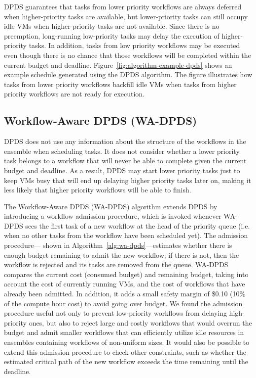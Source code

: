 \documentclass[preprint,5p]{elsarticle}
\begin{document}
DPDS guarantees that tasks from lower priority workflows are always deferred
when higher-priority tasks are available, but lower-priority tasks can still
occupy idle VMs when higher-priority tasks are not available. Since there is
no preemption, long-running low-priority tasks may delay the execution of
higher-priority tasks. In addition, tasks from low priority workflows may be
executed even though there is no chance that those workflows will be completed
within the current budget and deadline. Figure~\ref{fig:algorithm-example-dpds}
shows an example schedule generated using the DPDS algorithm. The figure
illustrates how tasks from lower priority workflows backfill idle VMs when
tasks from higher priority workflows are not ready for execution.


\subsection{Workflow-Aware DPDS (WA-DPDS)}

DPDS does not use any information about the structure of the
workflows in the ensemble when scheduling tasks.  It does not
consider whether a lower priority task belongs to a workflow that will never be
able to complete given the current budget and deadline. As a result, DPDS may
start lower priority tasks just to keep VMs busy that will end up delaying
higher priority tasks later on, making it less likely that higher priority
workflows will be able to finish.

The Workflow-Aware DPDS (WA-DPDS) algorithm extends DPDS by introducing a
workflow admission procedure, which is invoked whenever WA-DPDS sees the first
task of a new workflow at the head of the priority queue (i.e. when no other
tasks from the workflow have been scheduled yet). The admission procedure---
shown in Algorithm~\ref{alg:wa-dpds}---estimates whether there is enough
budget remaining to admit the new workflow; if there is not, then the workflow
is rejected and its tasks are removed from the queue. WA-DPDS compares the
current cost (consumed budget) and remaining budget, taking into account the
cost of currently running VMs, and the cost of workflows that have already
been admitted. In addition, it adds a small safety margin of \$0.10 (10\% of the
compute hour cost) to avoid going over budget. We found the admission procedure useful not only to prevent
low-priority workflows from delaying high-priority ones, but also to reject
large and costly workflows that would overrun the budget and admit smaller
workflows that can efficiently utilize idle resources in 
ensembles containing workflows of non-uniform sizes. It would also be possible 
to extend this admission procedure to check other constraints, such as whether
the estimated critical path of the new workflow exceeds the time remaining
until the deadline.
\end{document}
